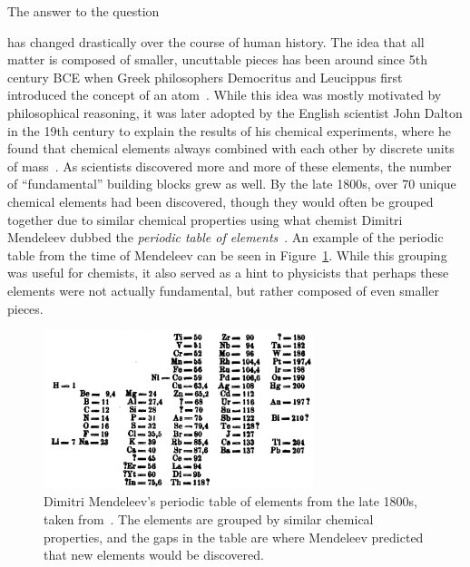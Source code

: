 The answer to the question 
\begin{center}
\end{center}
has changed drastically over the course of human history. The idea that all matter is composed of smaller, uncuttable pieces has been around since 5th century BCE when Greek philosophers Democritus and Leucippus first introduced the concept of an atom~\cite{GreekAtom}. While this idea was mostly motivated by philosophical reasoning, it was later adopted by the English scientist John Dalton in the 19th century to explain the results of his chemical experiments, where he found that chemical elements always combined with each other by discrete units of mass~\cite{Dalton}. As scientists discovered more and more of these elements, the number of ``fundamental'' building blocks grew as well. By the late 1800s, over 70 unique chemical elements had been discovered, though they would often be grouped together due to similar chemical properties using what chemist Dimitri Mendeleev dubbed the \textit{periodic table of elements}~\cite{PeriodicTable}. An example of the periodic table from the time of Mendeleev can be seen in Figure~\ref{fig:periodic_table}. While this grouping was useful for chemists, it also served as a hint to physicists that perhaps these elements were not actually fundamental, but rather composed of even smaller pieces.

\begin{figure}[ht]
    \centering
    \includegraphics[width=0.7\textwidth]{figures/introduction/PeriodicTable.png}
    \caption{Dimitri Mendeleev's periodic table of elements from the late 1800s, taken from~\cite{MendeleevPaper}. The elements are grouped by similar chemical properties, and the gaps in the table are where Mendeleev predicted that new elements would be discovered.}
    \label{fig:periodic_table}
\end{figure}


